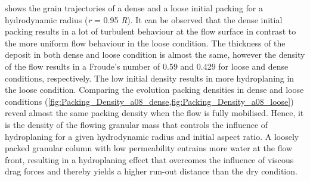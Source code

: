 \documentclass[12pt,a4paper,twocolumn,fleqn]{narms}
\begin{document}
 shows the grain trajectories of a dense and a loose 
initial packing for a hydrodynamic radius (\textit{r} = 0.95 \textit{R}). It 
can be observed that 
the dense initial packing results in a lot of turbulent behaviour at the flow 
surface in contrast to the more uniform flow behaviour in the loose condition. 
The thickness of the deposit in both dense and loose condition is almost the 
same, however the density of the flow results in a Froude's number of 0.59 and
0.429 for loose and dense conditions, respectively. The low initial density 
results in more hydroplaning in the loose condition.
Comparing the evolution packing densities in dense and loose conditions
(\cref{fig:Packing_Density_a08_dense,fig:Packing_Density_a08_loose}) 
reveal almost the same packing density when the flow is fully mobilised. Hence, 
it is the density of the flowing granular mass that controls the influence of 
hydroplaning for a given hydrodynamic radius and initial aspect ratio. A 
loosely packed granular column with low permeability entrains 
more water at the flow front, resulting in a hydroplaning effect that overcomes 
the influence of viscous drag forces and thereby yields a higher run-out 
distance than the dry condition.
\end{document}
